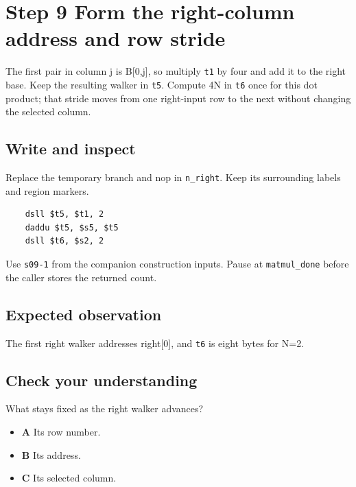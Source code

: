 \section{Step 9 Form the right-column address and row stride}\label{matmul-s09}

The first pair in column j is B[0,j], so multiply \texttt{t1} by four and add it to the right base. Keep the resulting walker in \texttt{t5}. Compute 4N in \texttt{t6} once for this dot product; that stride moves from one right-input row to the next without changing the selected column.

\subsection{Write and inspect}
Replace the temporary branch and nop in \texttt{n\_right}. Keep its surrounding labels and region markers.

\begin{verbatim}
    dsll $t5, $t1, 2
    daddu $t5, $s5, $t5
    dsll $t6, $s2, 2
\end{verbatim}
Use \texttt{s09-1} from the companion construction inputs. Pause at \texttt{matmul\_done} before the caller stores the returned count.

\subsection{Expected observation}
The first right walker addresses right[0], and \texttt{t6} is eight bytes for N=2.

\subsection{Check your understanding}
What stays fixed as the right walker advances?

\begin{itemize}
  \item \textbf{A} Its row number.
  \item \textbf{B} Its address.
  \item \textbf{C} Its selected column.
\end{itemize}

